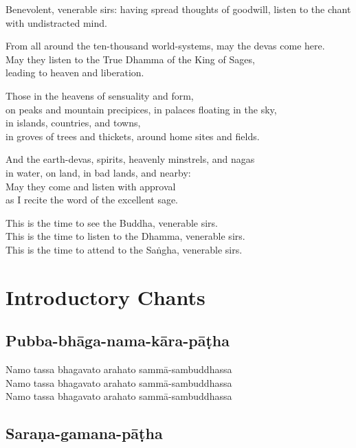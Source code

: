 \begin{english}
  Benevolent, venerable sirs: having spread thoughts of goodwill, listen to the
  chant with undistracted mind.

  From all around the ten-thousand world-systems, may the devas come here.\\
  May they listen to the True Dhamma of the King of Sages,\\
  leading to heaven and liberation.

  Those in the heavens of sensuality and form,\\
  on peaks and mountain precipices, in palaces floating in the sky,\\
  in islands, countries, and towns,\\
  in groves of trees and thickets, around home sites and fields.

  And the earth-devas, spirits, heavenly minstrels, and nagas\\
  in water, on land, in bad lands, and nearby:\\
  May they come and listen with approval\\
  as I recite the word of the excellent sage.

  This is the time to see the Buddha, venerable sirs.\\
  This is the time to listen to the Dhamma, venerable sirs.\\
  This is the time to attend to the Saṅgha, venerable sirs.
\end{english}

\clearpage

\section{Introductory Chants}

\subsection{Pubba-bhāga-nama-kāra-pāṭha}
\label{namo-tassa}

Namo tassa bhagavato arahato sammā-sambuddhassa\\
Namo tassa bhagavato arahato sammā-sambuddhassa\\
Namo tassa bhagavato arahato sammā-sambuddhassa

\subsection{Saraṇa-gamana-pāṭha}
\label{buddham-saranam}

